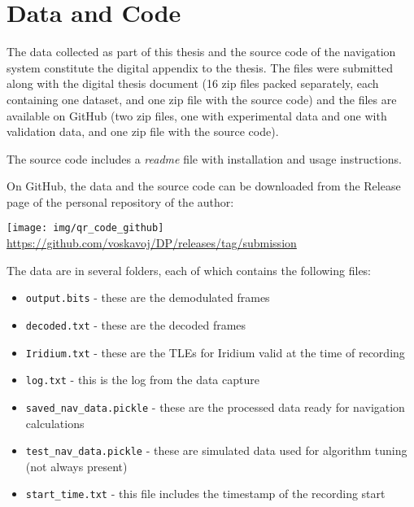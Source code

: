 \chapter{Data and Code}
The data collected as part of this thesis and the source code of the navigation system constitute the digital appendix to the thesis. The files were submitted along with the digital thesis document (16 zip files packed separately, each containing one dataset, and one zip file with the source code) and the files are available on GitHub (two zip files, one with experimental data and one with validation data, and one zip file with the source code).

The source code includes a \textit{readme} file with installation and usage instructions.

On GitHub, the data and the source code can be downloaded from the Release page of the personal repository of the author:

\begin{center}
   \texttt{[image: img/qr\_code\_github]}
   \url{https://github.com/voskavoj/DP/releases/tag/submission}
\end{center}


The data are in several folders, each of which contains the following files:
\begin{itemize}
    \item \texttt{output.bits} - these are the demodulated frames
    \item \texttt{decoded.txt} - these are the decoded frames 
    \item \texttt{Iridium.txt} - these are the TLEs for Iridium valid at the time of recording
    \item \texttt{log.txt} - this is the log from the data capture
    \item \texttt{saved\_nav\_data.pickle} - these are the processed data ready for navigation calculations
    \item \texttt{test\_nav\_data.pickle} - these are simulated data used for algorithm tuning (not always present)
    \item \texttt{start\_time.txt} - this file includes the timestamp of the recording start
\end{itemize}
